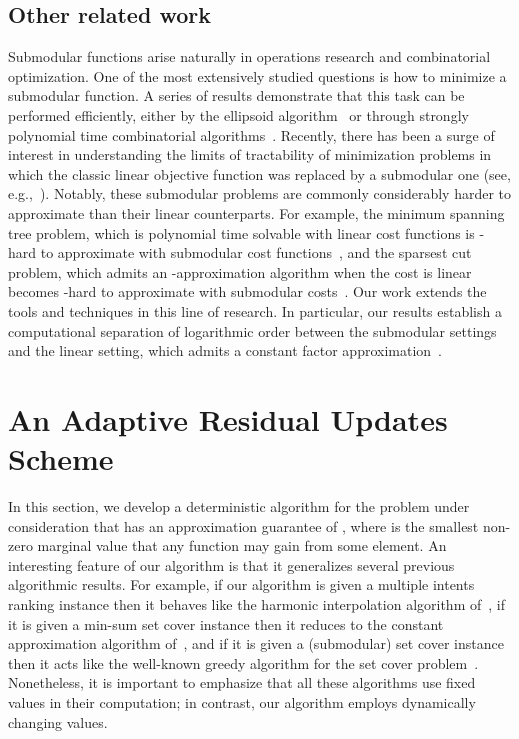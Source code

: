 \documentclass[11pt]{article}
\theoremstyle{plain}
\theoremstyle{definition}
\begin{document}
\subsection{Other related work}
Submodular functions arise naturally in operations research and
combinatorial optimization. One of the most extensively studied
questions is how to minimize a submodular function. A series of
results demonstrate that this task can be performed efficiently,
either by the ellipsoid algorithm~\cite{GrotschelLS81} or through
strongly polynomial time combinatorial
algorithms~\cite{Schrijver00,IwataFF01,Iwata03,Orlin07,Iwata08,IwataO09}.
Recently, there has been a surge of interest in understanding the
limits of tractability of minimization problems in which the
classic linear objective function was replaced by a submodular one
(see, e.g.,~\cite{SvitkinaF08,GoemansHIM09,GoelKTW09,IwataN09}).
Notably, these submodular problems are commonly considerably
harder to approximate than their linear counterparts. For example,
the minimum spanning tree problem, which is polynomial time
solvable with linear cost functions is -hard to
approximate with submodular cost functions~\cite{GoelKTW09}, and
the sparsest cut problem, which admits an -approximation algorithm when the cost is
linear~\cite{AroraHK10} becomes -hard to
approximate with submodular costs~\cite{SvitkinaF08}. Our work
extends the tools and techniques in this line of research. In
particular, our results establish a computational separation of
logarithmic order between the submodular settings and the linear
setting, which admits a constant factor
approximation~\cite{AzarG10}.


\section{An Adaptive Residual Updates Scheme} \label{sec:AdaptiveScheme}

In this section, we develop a deterministic algorithm for the
problem under consideration that has an approximation guarantee of
, where  is the smallest non-zero marginal value that any function
may gain from some element. An interesting feature of our
algorithm is that it generalizes several previous algorithmic
results. For example, if our algorithm is given a multiple intents
ranking instance then it behaves like the harmonic interpolation
algorithm of~\cite{AzarGY09}, if it is given a min-sum set cover
instance then it reduces to the constant approximation algorithm
of~\cite{FeigeLT04}, and if it is given a (submodular) set cover
instance then it acts like the well-known greedy algorithm for the
set cover problem~\cite{Wolsey82b}. Nonetheless, it is important
to emphasize that all these algorithms use fixed values in their
computation; in contrast, our algorithm employs dynamically
changing values.
\end{document}
